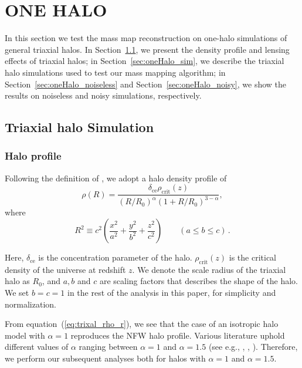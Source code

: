 \documentclass[twocolumn, usenames, dvipsnames]{aastex63}
\begin{document}
\section{ONE HALO}
\label{sec:onehalo}

In this section we test the mass map reconstruction on one-halo simulations of
general triaxial halos. In Section~\ref{sec:oneHalo_trihalo}, we present the
density profile and lensing effects of triaxial halos; in
Section~\ref{sec:oneHalo_sim}, we describe the triaxial halo simulations used
to test our mass mapping algorithm; in Section~\ref{sec:oneHalo_noiseless} and
Section~\ref{sec:oneHalo_noisy}, we show the results on noiseless and noisy
simulations, respectively.

\subsection{Triaxial halo Simulation}
\label{sec:oneHalo_trihalo}

\subsubsection{Halo profile}
Following the definition of \cite{halo_JS02}, we adopt a halo density profile
of
\begin{equation}
    \label{eq:trixal_rho_r}
    \rho(R) = \frac{\delta_{\text{ce}} \rho_{\text{crit}}(z)}{(R/R_0)^{\alpha}
    (1+R/R_0)^{3-\alpha}},
\end{equation}
where
\begin{equation}
    R^2\equiv c^2 \left(\frac{x^2}{a^2} + \frac{y^2}{b^2} + \frac{z^2}{c^2}\right)
    \quad \quad (a\leq b \leq c) \,. \label{halo density}
\end{equation}

Here, $\delta_{\mathrm{ce}}$ is the concentration parameter of the halo.
$\rho_{\mathrm{crit}}(z)$ is the critical density of the universe at redshift
$z$. We denote the scale radius of the triaxial halo as $R_0$, and $a,b$ and $c$ are scaling
factors that describes the shape of the halo. We set $b=c=1$ in the rest of the
analysis in this paper, for simplicity and normalization.

From equation~(\ref{eq:trixal_rho_r}), we see that the case of an isotropic
halo model with $\alpha = 1$ reproduces the NFW halo profile. Various
literature uphold different values of $\alpha$ ranging between $\alpha=1$ and
$\alpha=1.5$ (see e.g., \citealt{halo_nfw}, \citealt{halo_Moore_1999},
\citealt{halo_OLS03}). Therefore, we perform our subsequent analyses both for halos with
$\alpha=1$ and $\alpha=1.5$.
\end{document}
